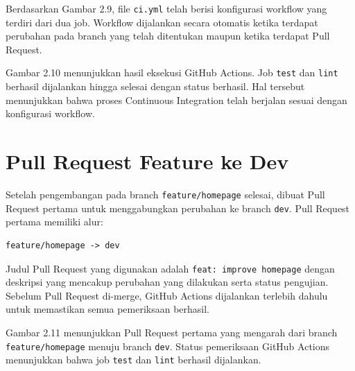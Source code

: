 \documentclass[a4paper,oneside,11pt]{book}
\begin{document}

Berdasarkan Gambar 2.9, file \texttt{ci.yml} telah berisi konfigurasi workflow yang terdiri dari dua job. Workflow dijalankan secara otomatis ketika terdapat perubahan pada branch yang telah ditentukan maupun ketika terdapat Pull Request.


Gambar 2.10 menunjukkan hasil eksekusi GitHub Actions. Job \texttt{test} dan \texttt{lint} berhasil dijalankan hingga selesai dengan status berhasil. Hal tersebut menunjukkan bahwa proses Continuous Integration telah berjalan sesuai dengan konfigurasi workflow.

\section{Pull Request Feature ke Dev}

Setelah pengembangan pada branch \texttt{feature/homepage} selesai, dibuat Pull Request pertama untuk menggabungkan perubahan ke branch \texttt{dev}. Pull Request pertama memiliki alur:

\begin{lstlisting}
feature/homepage -> dev
\end{lstlisting}

Judul Pull Request yang digunakan adalah \texttt{feat: improve homepage} dengan deskripsi yang mencakup perubahan yang dilakukan serta status pengujian. Sebelum Pull Request di-merge, GitHub Actions dijalankan terlebih dahulu untuk memastikan semua pemeriksaan berhasil.


Gambar 2.11 menunjukkan Pull Request pertama yang mengarah dari branch \texttt{feature/homepage} menuju branch \texttt{dev}. Status pemeriksaan GitHub Actions menunjukkan bahwa job \texttt{test} dan \texttt{lint} berhasil dijalankan.
\end{document}
